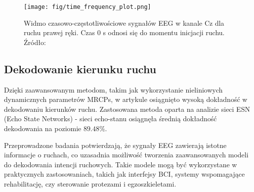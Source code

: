\documentclass[eeg_v4.tex]{subfiles}
\begin{document}
    \begin{figure}[h]
        \centering
        \texttt{[image: fig/time\_frequency\_plot.png]}
        \caption
        {Widmo czasowo-częstotliwościowe sygnałów EEG w kanale Cz dla ruchu prawej ręki. Czas 0 s odnosi się do momentu
        inicjacji ruchu. Źródło: \cite{wang2022}}
        \label{fig:time_frequency_plot}
    \end{figure}

    \subsection{Dekodowanie kierunku ruchu}
    Dzięki zaawansowanym metodom, takim jak wykorzystanie nieliniowych dynamicznych parametrów MRCPs, w artykule
    \cite{wang2022} osiągnięto
    wysoką dokładność w dekodowaniu kierunków ruchu. Zastosowana metoda oparta na analizie sieci ESN (Echo State
    Networks) - sieci echo-stanu
    osiągnęła średnią dokładność dekodowania na poziomie $89.48\%$.

    Przeprowadzone badania potwierdzają, że sygnały EEG zawierają istotne informacje o ruchach, co uzasadnia możliwość
    tworzenia zaawansowanych modeli do dekodowania intencji ruchowych. Takie modele mogą być wykorzystane w praktycznych
    zastosowaniach, takich jak interfejsy BCI, systemy wspomagające rehabilitację, czy sterowanie protezami i
    egzoszkieletami.
\end{document}
